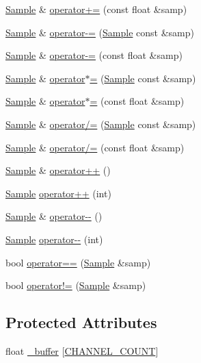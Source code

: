 \begin{DoxyCompactItemize}
\hyperlink{classSignal_1_1Sample}{Sample} \& \hyperlink{classSignal_1_1Sample_a7d9e82509a4d9df0106c3f683a556c83}{operator+=} (const float \&samp)
\item 
\hyperlink{classSignal_1_1Sample}{Sample} \& \hyperlink{classSignal_1_1Sample_aa242d4770f720623d6a7f7455d1230f2}{operator-\/=} (\hyperlink{classSignal_1_1Sample}{Sample} const \&samp)
\item 
\hyperlink{classSignal_1_1Sample}{Sample} \& \hyperlink{classSignal_1_1Sample_a5700d16aeba7eaacc851dd33954bc097}{operator-\/=} (const float \&samp)
\item 
\hyperlink{classSignal_1_1Sample}{Sample} \& \hyperlink{classSignal_1_1Sample_ab5c0df96056ee1a97de1c0cd8e4537e4}{operator$\ast$=} (\hyperlink{classSignal_1_1Sample}{Sample} const \&samp)
\item 
\hyperlink{classSignal_1_1Sample}{Sample} \& \hyperlink{classSignal_1_1Sample_a48ef3a75fadf8bc9a1d881d3e56629c3}{operator$\ast$=} (const float \&samp)
\item 
\hyperlink{classSignal_1_1Sample}{Sample} \& \hyperlink{classSignal_1_1Sample_aa25e485265561cc1b72540db13e7de60}{operator/=} (\hyperlink{classSignal_1_1Sample}{Sample} const \&samp)
\item 
\hyperlink{classSignal_1_1Sample}{Sample} \& \hyperlink{classSignal_1_1Sample_a40646177e45aa55e547b0109e1f4103c}{operator/=} (const float \&samp)
\item 
\hyperlink{classSignal_1_1Sample}{Sample} \& \hyperlink{classSignal_1_1Sample_ae59af6172226531fd5b7fb4dec32b04c}{operator++} ()
\item 
\hyperlink{classSignal_1_1Sample}{Sample} \hyperlink{classSignal_1_1Sample_a685283f98cd72d2b0b281eaca0eb18fc}{operator++} (int)
\item 
\hyperlink{classSignal_1_1Sample}{Sample} \& \hyperlink{classSignal_1_1Sample_a4357ffac71ce9bb92ea771483a82e157}{operator-\/-\/} ()
\item 
\hyperlink{classSignal_1_1Sample}{Sample} \hyperlink{classSignal_1_1Sample_aa2572994e3ad3c7edff5336a7937a7e1}{operator-\/-\/} (int)
\item 
bool \hyperlink{classSignal_1_1Sample_a9a3b4c31bff60e6861e833a1f9c46df7}{operator==} (\hyperlink{classSignal_1_1Sample}{Sample} \&samp)
\item 
bool \hyperlink{classSignal_1_1Sample_a1c06d852edfeade895c5f4935357cf73}{operator!=} (\hyperlink{classSignal_1_1Sample}{Sample} \&samp)
\end{DoxyCompactItemize}
\subsection*{Protected Attributes}
\begin{DoxyCompactItemize}
\item 
float \hyperlink{classSignal_1_1Sample_ad609d308b1c36b007bd8210d316c070b}{\+\_\+buffer} \mbox{[}\hyperlink{Sample_8h_a29e42927003b0aa647ee45965f4ccb07}{C\+H\+A\+N\+N\+E\+L\+\_\+\+C\+O\+U\+N\+T}\mbox{]}
\end{DoxyCompactItemize}
